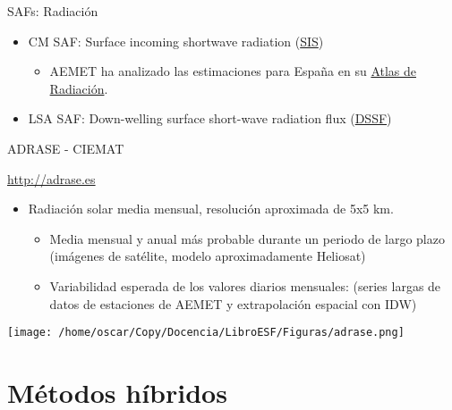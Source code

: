 \documentclass[xcolor={usenames,svgnames,dvipsnames}]{beamer}
\begin{document}
\begin{frame}[label=sec-5-4]{SAFs: Radiación}
\begin{itemize}
\item \alert{CM SAF}: Surface incoming shortwave radiation (\href{http://wui.cmsaf.eu/safira/action/viewDoiDetails?acronym=RAD_MVIRI_V001}{SIS})

\begin{itemize}
\item AEMET ha analizado las estimaciones para España en su \href{http://www.aemet.es/es/serviciosclimaticos/datosclimatologicos/atlas_radiacion_solar}{Atlas de Radiación}.
\end{itemize}

\item \alert{LSA SAF}: Down-welling surface short-wave radiation flux (\href{http://landsaf.meteo.pt/algorithms.jsp?seltab=1&starttab=1}{DSSF})
\end{itemize}
\end{frame}
\begin{frame}[label=sec-5-5]{ADRASE - CIEMAT}
\begin{block}{\url{http://adrase.es}}
\begin{itemize}
\item Radiación solar media mensual, resolución aproximada de 5x5 km.
\begin{itemize}
\item Media mensual y anual más probable durante un periodo de largo
plazo (imágenes de satélite, modelo aproximadamente Heliosat)
\item Variabilidad esperada de los valores diarios mensuales: (series
largas de datos de estaciones de AEMET y extrapolación espacial
con IDW)
\end{itemize}
\end{itemize}

\begin{center}
\texttt{[image: /home/oscar/Copy/Docencia/LibroESF/Figuras/adrase.png]}
\end{center}
\end{block}
\end{frame}
\section{Métodos híbridos}
\label{sec-6}
\end{document}
